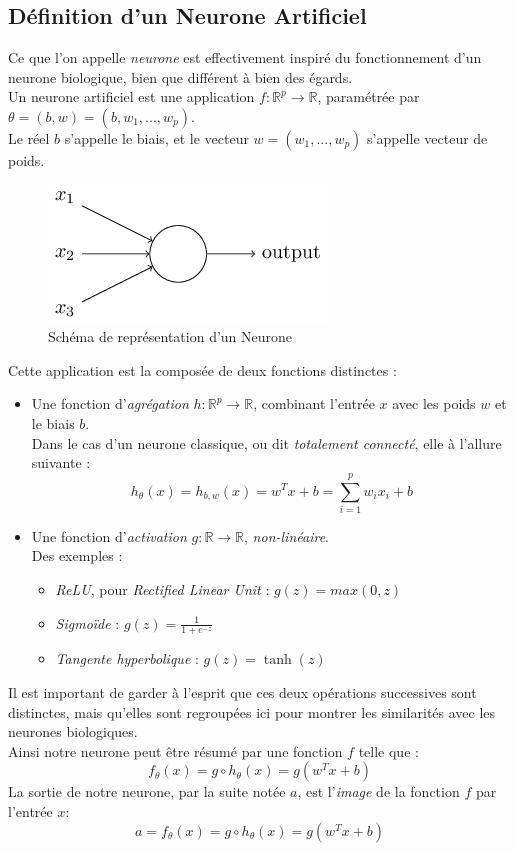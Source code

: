 \documentclass[10pt,a4paper]{report}
\begin{document}
		\subsection{Définition d'un Neurone Artificiel}
		Ce que l'on appelle \emph{neurone} est effectivement inspiré du fonctionnement d'un neurone biologique, bien que différent à bien des égards.\\
			Un neurone artificiel est une application $f : \mathbb{R}^p \rightarrow \mathbb{R}$, paramétrée par $\theta = (b,w) = (b, w_1, ..., w_p)$.\\
			Le réel $b$ s'appelle le biais, et le vecteur $w = (w_1, ..., w_p)$ s'appelle vecteur de poids.
			\begin{figure}[H]
				\begin{center}
					\includegraphics[scale=0.5]{Images/neuron.png}
					\caption{Schéma de représentation d'un Neurone}
				\end{center}
			\end{figure}
			Cette application est la composée de deux fonctions distinctes :
			\begin{itemize}
				\item Une fonction d’\emph{agrégation} $h : \mathbb{R}^p \rightarrow \mathbb{R}$, combinant l'entrée $x$ avec les poids $w$ et le biais $b$.\\
				Dans le cas d'un neurone classique, ou dit \emph{totalement connecté}, elle à l'allure suivante :
				$$h_\theta(x) = h_{b,w}(x) = w^Tx + b = \sum_{i=1}^{p}{w_i x_i} + b$$
				\item Une fonction d'\emph{activation} $g : \mathbb{R} \rightarrow \mathbb{R}$, \emph{non-linéaire}.\\
				Des exemples :
				\begin{itemize}
					\item \emph{ReLU}, pour \emph{Rectified Linear Unit} : $g(z) = max(0,z)$
					\item \emph{Sigmoïde} : $g(z) = \frac{1}{1+e^{-z}}$
					\item \emph{Tangente hyperbolique} : $g(z) = \tanh(z)$
				\end{itemize}
			\end{itemize}
		Il est important de garder à l'esprit que ces deux opérations successives sont distinctes, mais qu'elles sont regroupées ici pour montrer les similarités avec les neurones biologiques.\\
		Ainsi notre neurone peut être résumé par une fonction $f$ telle que :
		$$f_\theta(x) = g \circ h_\theta(x) = g(w^Tx + b)$$
		La sortie de notre neurone, par la suite notée $a$, est l'\emph{image} de la fonction $f$ par l'entrée $x$:
		$$a = f_\theta(x) = g \circ h_\theta(x) = g(w^Tx + b)$$
\end{document}
